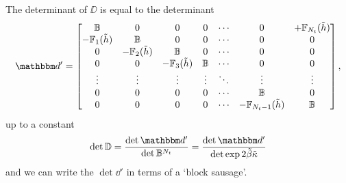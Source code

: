 The determinant of $\DD$ is equal to the determinant
\begin{align}
    \dd'
	=
	\begin{bmatrix}
			\BB                  & 0                             & 0                             & 0             & \cdots & 0                                & +\FF_{N_t}(\tilde{h})
		\\	-\FF_{1}(\tilde{h})  & \BB                    & 0                             & 0             & \cdots & 0                                & 0
		\\	0                           & -\FF_{2}(\tilde{h})    & \BB                    & 0             & \cdots & 0                                & 0
		\\	0                           & 0                             & -\FF_{3}(\tilde{h})    & \BB    & \cdots & 0                                & 0
		\\	\vdots                      & \vdots                        & \vdots                        & \vdots        & \ddots & \vdots                           & \vdots
		\\	0                           & 0                             & 0                             & 0             & \cdots & \BB                       & 0
		\\	0                           & 0                             & 0                             & 0             & \cdots & -\FF_{N_t-1}(\tilde{h})   & \BB
	\end{bmatrix},
\end{align}
up to a constant
\begin{align}
    \det \DD = \frac{ \det \dd' }{ \det \BB^{N_t} } = \frac{ \det \dd' }{ \det \exp 2 \tilde{\beta}\tilde{\kappa} }
\end{align}
and we can write the $\det \dd'$ in terms of a `block sausage'.

